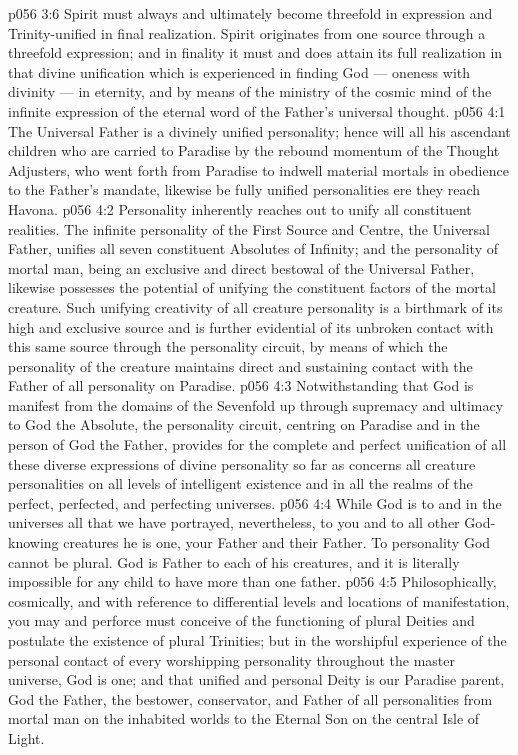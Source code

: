 \vs p056 3:6 Spirit must always and ultimately become threefold in expression and Trinity\hyp{}unified in final realization. Spirit originates from one source through a threefold expression; and in finality it must and does attain its full realization in that divine unification which is experienced in finding God --- oneness with divinity --- in eternity, and by means of the ministry of the cosmic mind of the infinite expression of the eternal word of the Father’s universal thought.
\vs p056 4:1 The Universal Father is a divinely unified personality; hence will all his ascendant children who are carried to Paradise by the rebound momentum of the Thought Adjusters, who went forth from Paradise to indwell material mortals in obedience to the Father’s mandate, likewise be fully unified personalities ere they reach Havona.
\vs p056 4:2 Personality inherently reaches out to unify all constituent realities. The infinite personality of the First Source and Centre, the Universal Father, unifies all seven constituent Absolutes of Infinity; and the personality of mortal man, being an exclusive and direct bestowal of the Universal Father, likewise possesses the potential of unifying the constituent factors of the mortal creature. Such unifying creativity of all creature personality is a birthmark of its high and exclusive source and is further evidential of its unbroken contact with this same source through the personality circuit, by means of which the personality of the creature maintains direct and sustaining contact with the Father of all personality on Paradise.
\vs p056 4:3 Notwithstanding that God is manifest from the domains of the Sevenfold up through supremacy and ultimacy to God the Absolute, the personality circuit, centring on Paradise and in the person of God the Father, provides for the complete and perfect unification of all these diverse expressions of divine personality so far as concerns all creature personalities on all levels of intelligent existence and in all the realms of the perfect, perfected, and perfecting universes.
\vs p056 4:4 \pc While God is to and in the universes all that we have portrayed, nevertheless, to you and to all other God\hyp{}knowing creatures he is one, your Father and their Father. To personality God cannot be plural. God is Father to each of his creatures, and it is literally impossible for any child to have more than one father.
\vs p056 4:5 Philosophically, cosmically, and with reference to differential levels and locations of manifestation, you may and perforce must conceive of the functioning of plural Deities and postulate the existence of plural Trinities; but in the worshipful experience of the personal contact of every worshipping personality throughout the master universe, God is one; and that unified and personal Deity is our Paradise parent, God the Father, the bestower, conservator, and Father of all personalities from mortal man on the inhabited worlds to the Eternal Son on the central Isle of Light.
